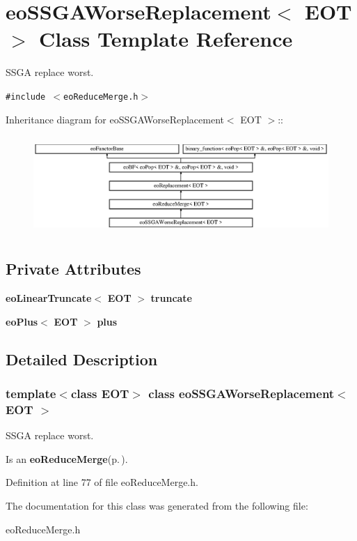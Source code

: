 \section{eo\-SSGAWorse\-Replacement$<$ EOT $>$ Class Template Reference}
\label{classeo_s_s_g_a_worse_replacement}
SSGA replace worst.  


{\tt \#include $<$eo\-Reduce\-Merge.h$>$}

Inheritance diagram for eo\-SSGAWorse\-Replacement$<$ EOT $>$::\begin{figure}[H]
\begin{center}
\leavevmode
\includegraphics[height=3.76344cm]{classeo_s_s_g_a_worse_replacement}
\end{center}
\end{figure}
\subsection*{Private Attributes}
\begin{CompactItemize}
\item 
{\bf eo\-Linear\-Truncate}$<$ {\bf EOT} $>$ {\bf truncate}\label{classeo_s_s_g_a_worse_replacement_r0}

\item 
{\bf eo\-Plus}$<$ {\bf EOT} $>$ {\bf plus}\label{classeo_s_s_g_a_worse_replacement_r1}

\end{CompactItemize}


\subsection{Detailed Description}
\subsubsection*{template$<$class EOT$>$ class eo\-SSGAWorse\-Replacement$<$ EOT $>$}

SSGA replace worst. 

Is an {\bf eo\-Reduce\-Merge}{\rm (p.\,\pageref{classeo_reduce_merge})}. 



Definition at line 77 of file eo\-Reduce\-Merge.h.

The documentation for this class was generated from the following file:\begin{CompactItemize}
\item 
eo\-Reduce\-Merge.h\end{CompactItemize}
